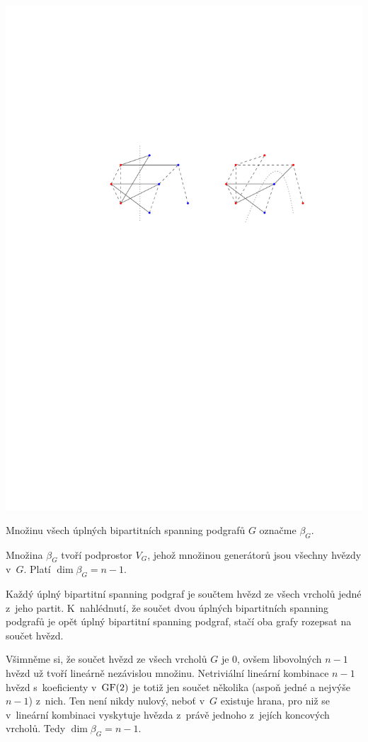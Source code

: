 \begin{center}
	\includegraphics{uplny_bipartitni_spanning.pdf}
\end{center}

\medskip
Množinu všech úplných bipartitních spanning podgrafů $G$ označme $\beta_G$. 

\lm Množina $\beta_G$ tvoří podprostor $V_G$, jehož množinou generátorů jsou všechny hvězdy v~$G$. Platí $\dim\beta_G=n-1$.

\dk Každý úplný bipartitní spanning podgraf je součtem hvězd ze všech vrcholů jedné z~jeho partit. K~nahlédnutí, že součet dvou úplných bipartitních spanning podgrafů je opět úplný bipartitní spanning podgraf, stačí oba grafy rozepsat na součet hvězd.

Všimněme si, že součet hvězd ze všech vrcholů $G$ je $0$, ovšem libovolných $n-1$ hvězd už tvoří lineárně nezávislou množinu. Netriviální lineární kombinace $n-1$ hvězd s~koeficienty v~$\mathrm{GF}(2)$ je totiž jen součet několika (aspoň jedné a nejvýše $n-1$) z~nich. Ten není nikdy nulový, neboť v~$G$ existuje hrana, pro niž se v~lineární kombinaci vyskytuje hvězda z~právě jednoho z~jejích koncových vrcholů. Tedy $\dim\beta_G=n-1$.

